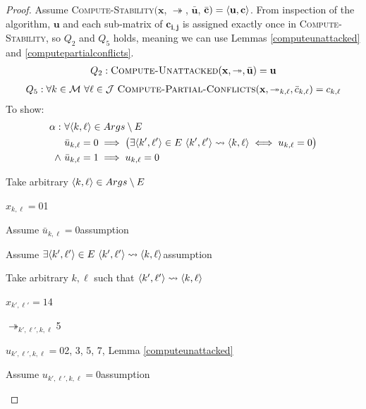 \begin{proof}
	Assume \textsc{Compute-Stability}$(\mathbf{x}$, $\twoheadrightarrow$, $\bar{\mathbf{u}}$, $\bar{\mathbf{c}})=\langle{\mathbf{u}},{\mathbf{c}}\rangle$. From inspection of the algorithm, $\mathbf{u}$ and each sub-matrix of $\mathbf{c_{i,j}}$ is assigned exactly once in \textsc{Compute-Stability}, so $Q_2$ and $Q_5$ holds, meaning we can use Lemmas \ref{computeunattacked} and \ref{computepartialconflicts}. 
	\begin{align*}
		Q_2: \textsc{Compute-Unattacked}(\mathbf{x},\twoheadrightarrow,\bar{\mathbf{u}})=\mathbf{u}
	\end{align*}
	\begin{align*}
		Q_5: \forall k\in\mathcal{M}\ \forall\ell\in\mathcal{J}\ \textsc{Compute-Partial-Conflicts}(\mathbf{x},\twoheadrightarrow_{k,\ell},\bar{c}_{k,\ell})=c_{k,\ell}
	\end{align*}
	To show:
	\begin{align*}
		\alpha:\ &\forall\langle{k},{\ell}\rangle\in Args\setminus E\\
		&\bar{u}_{k,\ell}=0\implies\big(\exists\langle{k'},{\ell'}\rangle\in E\ \langle{k'},{\ell'}\rangle\rightsquigarrow\langle{k},{\ell}\rangle\iff u_{k,\ell}=0\big)\\
		\land\ &\bar{u}_{k,\ell}=1\implies u_{k,\ell}=0\\
	\end{align*}
	\begin{enumerate}
		\item Take arbitrary $\langle{k},{\ell}\rangle\in Args\setminus E$
		\item $x_{k,\ell}=0$\hfill 1
		\item Assume $\bar{u}_{k,\ell}=0$\hfill assumption
			\item Assume $u_{k',\ell',k,\ell}=0$\hfill assumption
			\begin{level}

\end{level}
\end{level}
\end{enumerate}
\end{proof}
